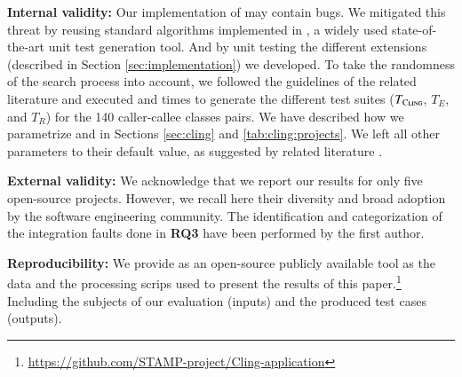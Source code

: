 
\textbf{Internal validity:}
Our implementation of \cling may contain bugs. We mitigated this threat by reusing standard algorithms implemented in \evosuite, a widely used state-of-the-art unit test generation tool. And by unit testing the different extensions (described in Section \ref{sec:implementation}) we developed. 
%
To take the randomness of the search process into account, we followed the guidelines of the related literature \cite{Arcuri2014} and executed \cling and  times to generate the different test suites ($T_{\textsc{Cling}}$, $T_{E}$, and $T_{R}$) for the 140 caller-callee classes pairs. 
%
We have described how we parametrize \cling and \evosuite in Sections \ref{sec:cling} and \ref{tab:cling:projects}. We left all other parameters to their default value, as suggested by related literature \cite{Arcuri2013, Panichella2015, Shamshiri2018}.

\textbf{External validity:}
We acknowledge that we report our results for only five open-source projects. However, we recall here their diversity and broad adoption by the software engineering community.
%
The identification and categorization of the integration faults done in \textbf{RQ3} have been performed by the first author.

\textbf{Reproducibility:}
We provide \cling as an open-source publicly available tool  as the data and the processing scrips used to present the results of this paper.\footnote{\url{https://github.com/STAMP-project/Cling-application}} Including the subjects of our evaluation (inputs) and the produced test cases (outputs). 

